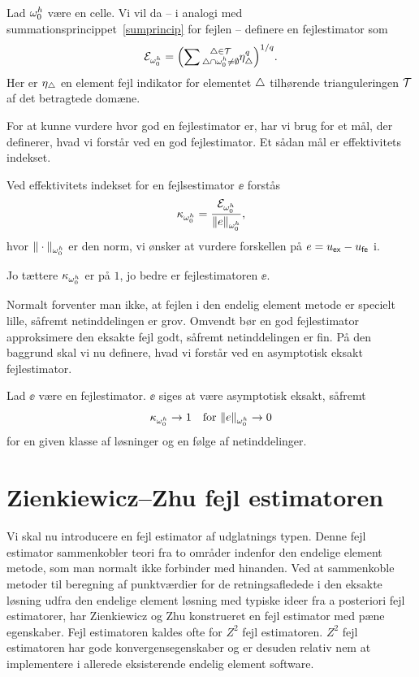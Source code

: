 \begin{definition}
Lad $\omega_{0}^{h}$ være en celle. Vi vil da -- i analogi med
summationsprincippet~\eqref{sumprincip} for fejlen -- definere en fejlestimator som
\begin{equation}
  {\mathcal{E}}_{\omega_{0}^{h}} = \Bigl( \sum \substack{ 
                      \triangle \in \mathcal T \\
                      \triangle \cap \omega_{0}^{h} \not= \emptyset
                    }
               \eta_{\triangle}^q\Bigr)^{1/q}.
\end{equation}
Her er $\eta_{\triangle}$ en element fejl indikator for elementet $\triangle$
tilhørende trianguleringen $\mathcal T$ af det betragtede domæne.
\end{definition}

For at kunne vurdere hvor god en fejlestimator er, har vi brug for et
mål, der definerer, hvad vi forstår ved en god fejlestimator. Et sådan
mål er effektivitets indekset.

\begin{definition}
Ved effektivitets indekset for en fejlsestimator $\ee$ forstås
\begin{equation}
  \kappa_{\omega_{0}^{h}} = \frac{{\mathcal{E}}_{\omega_{0}^{h}}}{\|e\|_{\omega_{0}^{h}}},
\end{equation}
hvor $\|\cdot\|_{\omega_{0}^{h}}$ er den norm, vi ønsker at vurdere forskellen på 
$e=u_{\mathsf{ex}} - u_{\mathsf{fe}}$ i. 
\end{definition}

Jo tættere $\kappa_{\omega_{0}^{h}}$ er på $1$, jo bedre er fejlestimatoren $\ee$. 

Normalt forventer man ikke, at fejlen i den endelig element metode er
specielt lille, såfremt netinddelingen er grov. Omvendt bør en god
fejlestimator approksimere den eksakte fejl godt, såfremt
netinddelingen er fin. På den baggrund skal vi nu definere, hvad vi
forstår ved en asymptotisk eksakt fejlestimator.
\begin{definition} \label{asympexact}
Lad $\ee$ være en fejlestimator. $\ee$ siges at være asymptotisk
eksakt, såfremt
\begin{equation}
  \kappa_{\omega_{0}^{h}} \rightarrow 1 \quad \text{for $\|e\|_{\omega_{0}^{h}}\rightarrow 0$}
\end{equation}
for en given klasse af løsninger og en følge af netinddelinger.
\end{definition}

\section{Zienkiewicz--Zhu fejl estimatoren} \label{z2}
Vi skal nu introducere en fejl estimator af udglatnings typen. Denne
fejl estimator sammenkobler teori fra to områder indenfor den endelige
element metode, som man normalt ikke forbinder med hinanden. Ved at
sammenkoble metoder til beregning af punktværdier for de
retningsafledede i den eksakte løsning udfra den endelige element
løsning med typiske ideer fra a posteriori fejl estimatorer,  har
Zienkiewicz og Zhu konstrueret en fejl estimator med pæne egenskaber.
Fejl estimatoren kaldes ofte for $Z^2$ fejl estimatoren. $Z^2$ fejl
estimatoren har gode konvergensegenskaber og er desuden relativ nem at
implementere i allerede eksisterende endelig element software. 

